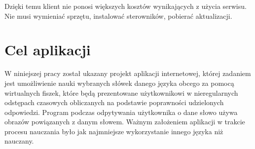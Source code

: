 Dzięki temu klient nie ponosi większych kosztów wynikających z użycia serwisu. Nie musi wymieniać sprzętu, instalować sterowników, pobierać aktualizacji. 

\newpage
\section{Cel aplikacji}
W niniejszej pracy został ukazany projekt aplikacji internetowej, której zadaniem jest umożliwienie nauki wybranych słówek danego języka obcego za pomocą wirtualnych fiszek, które będą prezentowane użytkownikowi w nieregularnych odstępach czasowych obliczanych na podstawie poprawności udzielonych odpowiedzi. Program podczas odpytywania użytkownika o dane słowo używa obrazów powiązanych z danym słowem. Ważnym założeniem aplikacji w trakcie procesu nauczania było jak najmniejsze wykorzystanie innego języka niż nauczany. 



